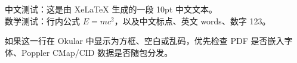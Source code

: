 \documentclass[10pt]{article}
\begin{document}
\noindent 中文测试：这是由 XeLaTeX 生成的一段 10pt 中文文本。\\
数学测试：行内公式 $E = mc^2$，以及中文标点、英文 words、数字 123。

\vspace{1em}
\noindent 如果这一行在 Okular 中显示为方框、空白或乱码，优先检查 PDF
是否嵌入字体、Poppler CMap/CID 数据是否随包分发。
\end{document}
